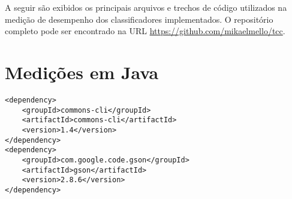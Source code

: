 A seguir são exibidos os principais arquivos e trechos de código utilizados na medição de desempenho dos classificadores implementados. O repositório completo pode ser encontrado na URL \url{https://github.com/mikaelmello/tcc}.

\section{Medições em Java}

\begin{lstlisting}[caption=Dependências Maven comuns a todas medições em Java]
<dependency>
    <groupId>commons-cli</groupId>
    <artifactId>commons-cli</artifactId>
    <version>1.4</version>
</dependency>
<dependency>
    <groupId>com.google.code.gson</groupId>
    <artifactId>gson</artifactId>
    <version>2.8.6</version>
</dependency>
\end{lstlisting}

